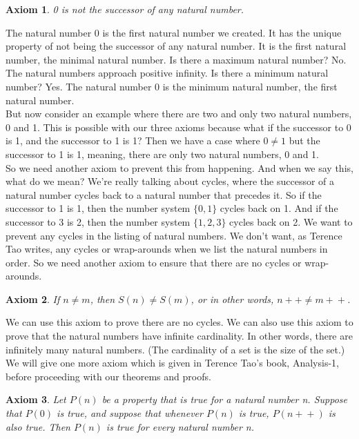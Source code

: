 \documentclass{article}
\newtheorem{axiom}{Axiom}
\newcommand{\inc}[1]{#1\!+\!+}
\begin{document}
\begin{axiom}
0 is not the successor of any natural number.
\end{axiom}

The natural number 0 is the first natural number we created. It has the unique property of not being the successor of any natural number. It is the first natural number, the minimal natural number. Is there a maximum natural number? No. The natural numbers approach positive infinity. Is there a minimum natural number? Yes. The natural number 0 is the minimum natural number, the first natural number. \\

But now consider an example where there are two and only two natural numbers, 0 and 1. This is possible with our three axioms because what if the successor to 0 is 1, and the successor to 1 is 1? Then we have a case where $0 \neq 1$ but the successor to 1 is 1, meaning, there are only two natural numbers, 0 and 1. \\

So we need another axiom to prevent this from happening. And when we say this, what do we mean? We're really talking about cycles, where the successor of a natural number cycles back to a natural number that precedes it. So if the successor to 1 is 1, then the number system $\{0, 1\}$ cycles back on 1. And if the successor to 3 is 2, then the number system $\{1, 2, 3\}$ cycles back on 2. We want to prevent any cycles in the listing of natural numbers. We don't want, as Terence Tao writes, any cycles or wrap-arounds when we list the natural numbers in order. So we need another axiom to ensure that there are no cycles or wrap-arounds.

\begin{axiom}
If $n \neq m$, then $S(n) \neq S(m)$, or in other words, $\inc{n} \neq \inc{m}$.
\end{axiom}

We can use this axiom to prove there are no cycles. We can also use this axiom to prove that the natural numbers have infinite cardinality. In other words, there are infinitely many natural numbers. (The cardinality of a set is the size of the set.) We will give one more axiom which is given in Terence Tao's book, Analysis-1, before proceeding with our theorems and proofs.

\begin{axiom}
Let $P(n)$ be a property that is true for a natural number n. Suppose that $P(0)$ is true, and suppose that whenever $P(n)$ is true, $P(\inc{n})$ is also true. Then $P(n)$ is true for every natural number n.
\end{axiom}
\end{document}
